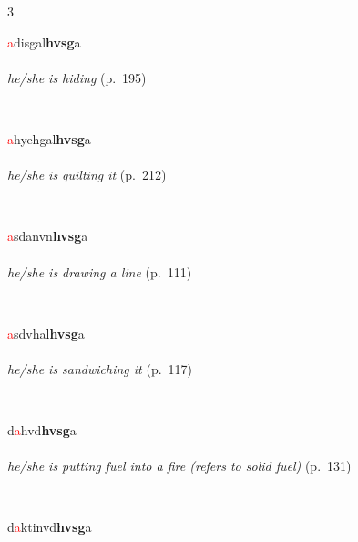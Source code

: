 \documentclass[oneside,openany]{book}%
\begin{document}
\noindent\begin{multicols}{3}%
\begin{minipage}[t]{\linewidth}
\raggedright\noindent \textcolor{Red}{a}disgal\textbf{hvsg}a\\
\\
\noindent \textit{he/she is hiding} (p.~195)
\end{minipage}\\[1em]%
\begin{minipage}[t]{\linewidth}
\raggedright\noindent \textcolor{Red}{a}hyehgal\textbf{hvsg}a\\
\\
\noindent \textit{he/she is quilting it} (p.~212)
\end{minipage}\\[1em]%
\begin{minipage}[t]{\linewidth}
\raggedright\noindent \textcolor{Red}{a}sdanvn\textbf{hvsg}a\\
\\
\noindent \textit{he/she is drawing a line} (p.~111)
\end{minipage}\\[1em]%
\begin{minipage}[t]{\linewidth}
\raggedright\noindent \textcolor{Red}{a}sdvhal\textbf{hvsg}a\\
\\
\noindent \textit{he/she is sandwiching it} (p.~117)
\end{minipage}\\[1em]%
\begin{minipage}[t]{\linewidth}
\raggedright\noindent d\textcolor{Red}{a}hvd\textbf{hvsg}a\\
\\
\noindent \textit{he/she is putting fuel into a fire (refers to solid fuel)} (p.~131)
\end{minipage}\\[1em]%
\begin{minipage}[t]{\linewidth}
\raggedright\noindent d\textcolor{Red}{a}ktinvd\textbf{hvsg}a\\
\\

\end{minipage}
\end{multicols}
\end{document}
